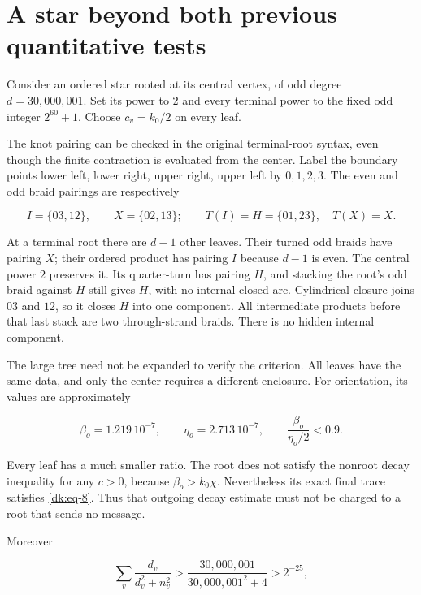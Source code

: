 \section{A star beyond both previous quantitative tests}\label{dk:sec-9}

Consider an ordered star rooted at its central vertex, of odd degree
\(d=30{,}000{,}001\). Set its power to 2 and every terminal power to the fixed
odd integer \(2^{60}+1\). Choose \(c_v=k_0/2\) on every leaf.

The knot pairing can be checked in the original terminal-root syntax,
even though the finite contraction is evaluated from the center. Label
the boundary points lower left, lower right, upper right, upper left
by \(0,1,2,3\). The even and odd braid pairings are respectively

\begin{equation}\label{dk:eq-54a}
I=\{03,12\},\qquad X=\{02,13\};\qquad
 T(I)=H=\{01,23\},\quad T(X)=X.
\end{equation}

At a terminal root there are \(d-1\) other leaves. Their turned odd
braids have pairing \(X\); their ordered product has pairing \(I\)
because \(d-1\) is even. The central power \(2\) preserves it. Its
quarter-turn has pairing \(H\), and stacking the root's odd
braid against \(H\) still gives \(H\), with no internal closed arc.
Cylindrical closure joins \(03\) and \(12\), so it closes \(H\)
into one component. All intermediate products before that last stack
are two through-strand braids. There is no hidden internal component.

The large tree need not be expanded to verify the criterion. All leaves
have the same data, and only the center requires a different enclosure.
For orientation, its values are approximately

\begin{equation}\label{dk:eq-54}
\beta_o=1.219\,10^{-7},\qquad
 \eta_o=2.713\,10^{-7},\qquad
       \frac{\beta_o}{\eta_o/2}<0.9.
\end{equation}

Every leaf has a much smaller ratio. The root does not satisfy the
nonroot decay inequality for any \(c>0\), because \(\beta_o>k_0\chi\).
Nevertheless its exact final trace satisfies \eqref{dk:eq-8}. Thus that outgoing
decay estimate must not be charged to a root that sends no message.

Moreover

\begin{equation}\label{dk:eq-55}
\sum_v\frac{d_v}{d_v^2+n_v^2}
       >\frac{30,000,001}{30,000,001^2+4}>2^{-25},
\end{equation}

